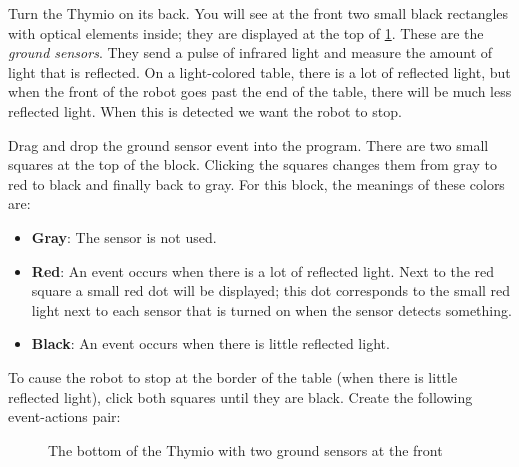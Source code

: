 
Turn the Thymio on its back. You will see at the front two small black
rectangles with optical elements inside; they are displayed at the top
of \cref{fig.bottom}. These are the \emph{ground sensors}. They send a
pulse of infrared light and measure the amount of light that is
reflected. On a light-colored table, there is a lot of reflected light,
but when the front of the robot goes past the end of the table, there
will be much less reflected light. When this is detected we want the
robot to stop.


Drag and drop the ground sensor event  into the
program. There are two small squares at the top of the block. Clicking
the squares changes them from gray to red to black and finally back to
gray. For this block, the meanings of these colors are:

\begin{itemize}

\item \textbf{Gray}: The sensor is not used.

\item \textbf{Red}: An event occurs when there is a lot of reflected
light.\label{p.proximity-colors1} Next to the red square a small red dot
will be displayed; this dot corresponds to the small red light next to
each sensor that is turned on when the sensor detects something.

\item \textbf{Black}: An event occurs when there is little reflected light.

\end{itemize}


To cause the robot to stop at the border of the table (when there is
little reflected light), click both squares until they are black.
Create the following event-actions pair: 

\begin{figure}
\begin{center}
\caption{The bottom of the Thymio with two ground sensors at the front}\label{fig.bottom}
\end{center}
\end{figure}

